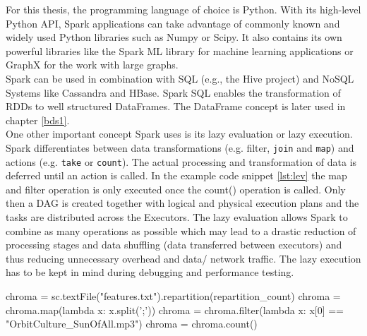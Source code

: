 For this thesis, the programming language of choice is Python. With its high-level Python API, Spark applications can take advantage of commonly known and widely used Python libraries such as Numpy or Scipy. It also contains its own powerful libraries like the Spark ML library for machine learning applications or GraphX for the work with large graphs.\\ 
Spark can be used in combination with SQL (e.g., the Hive project) and NoSQL Systems like Cassandra and HBase. Spark SQL enables the transformation of RDDs to well structured DataFrames. The DataFrame concept is later used in chapter \ref{bds1}.\\
One other important concept Spark uses is its lazy evaluation or lazy execution. Spark differentiates between data transformations (e.g. filter, \lstinline{join} and \lstinline{map}) and actions (e.g. \lstinline{take} or \lstinline{count}). The actual processing and transformation of data is deferred until an action is called. In the example code snippet \ref{lst:lev} the map and filter operation is only executed once the count() operation is called. Only then a DAG is created together with logical and physical execution plans and the tasks are distributed across the Executors. The lazy evaluation allows Spark to combine as many operations as possible which may lead to a drastic reduction of processing stages and data shuffling (data transferred between executors) and thus reducing unnecessary overhead and data/ network traffic. The lazy execution has to be kept in mind during debugging and performance testing. \cite[p.73]{sparkbook1}

\begin{pythonCode}[frame=single,label={lst:lev},caption={lazy evaluation},captionpos=b]
chroma = sc.textFile("features.txt").repartition(repartition_count)
chroma = chroma.map(lambda x: x.split(';'))
chroma = chroma.filter(lambda x: x[0] == "OrbitCulture_SunOfAll.mp3")
chroma = chroma.count()
\end{pythonCode}

